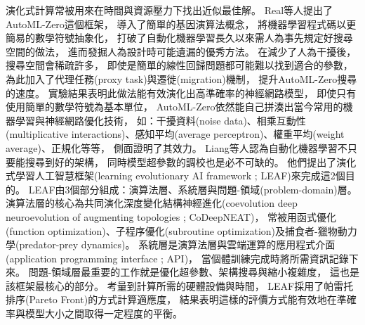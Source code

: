 \documentclass[a4paper,14pt]{extarticle}
\begin{document}
            演化式計算常被用來在時間與資源壓力下找出近似最佳解。
            Real等人\cite{pmlr-v119-real20a}提出了AutoML-Zero這個框架，
            導入了簡單的基因演算法概念，
            將機器學習程式碼以更簡易的數學符號抽象化，
            打破了自動化機器學習長久以來需人為事先規定好搜尋空間的做法，
            進而發掘人為設計時可能遺漏的優秀方法。
            在減少了人為干擾後，
            搜尋空間會稀疏許多，
            即使是簡單的線性回歸問題都可能難以找到適合的參數，
            為此加入了代理任務(proxy task)與遷徙(migration)機制，
            提升AutoML-Zero搜尋的速度。
            實驗結果表明此做法能有效演化出高準確率的神經網路模型，
            即使只有使用簡單的數學符號為基本單位，
            AutoML-Zero依然能自己拼湊出當今常用的機器學習與神經網路優化技術，
            如：干擾資料(noise data)、相乘互動性(multiplicative interactions)、感知平均(average perceptron)、權重平均(weight average)、正規化等等，
            側面證明了其效力。
            Liang等人\cite{10.1145/3321707.3321721}認為自動化機器學習不只要能搜尋到好的架構，
            同時模型超參數的調校也是必不可缺的。
            他們提出了演化式學習人工智慧框架(learning evolutionary AI framework ; LEAF)來完成這2個目的。
            LEAF由3個部分組成：演算法層、系統層與問題-領域(problem-domain)層。
            演算法層的核心為共同演化深度變化結構神經進化(coevolution deep neuroevolution of augmenting topologies ; CoDeepNEAT)，
            常被用函式優化(function optimization)、子程序優化(subroutine optimization)及捕食者-獵物動力學(predator-prey dynamics)。
            系統層是演算法層與雲端運算的應用程式介面(application programming interface ; API)，
            當個體訓練完成時將所需資訊記錄下來。
            問題-領域層最重要的工作就是優化超參數、架構搜尋與縮小複雜度，
            這也是該框架最核心的部分。
            考量到計算所需的硬體設備與時間，
            LEAF採用了帕雷托排序(Pareto Front)的方式計算適應度，
            結果表明這樣的評價方式能有效地在準確率與模型大小之間取得一定程度的平衡。
        
\end{document}
